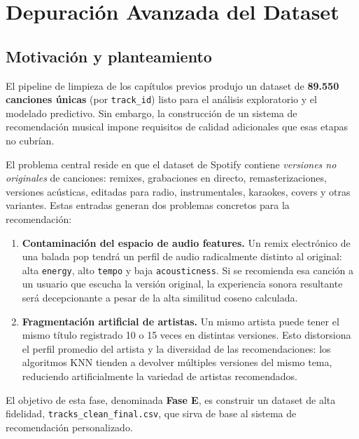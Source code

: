 \documentclass[12pt, a4paper]{book}
\theoremstyle{definition}
\begin{document}
\chapter{Depuración Avanzada del Dataset}
\label{ch:depuracion}

\section{Motivación y planteamiento}

El pipeline de limpieza de los capítulos previos produjo un dataset de
\textbf{89.550 canciones únicas} (por \texttt{track\_id}) listo para el
análisis exploratorio y el modelado predictivo. Sin embargo, la construcción
de un sistema de recomendación musical impone requisitos de calidad
adicionales que esas etapas no cubrían.

El problema central reside en que el dataset de Spotify contiene
\textit{versiones no originales} de canciones: remixes, grabaciones en
directo, remasterizaciones, versiones acústicas, editadas para radio,
instrumentales, karaokes, covers y otras variantes. Estas entradas generan
dos problemas concretos para la recomendación:

\begin{enumerate}
  \item \textbf{Contaminación del espacio de audio features.} Un remix
        electrónico de una balada pop tendrá un perfil de audio radicalmente
        distinto al original: alta \texttt{energy}, alto \texttt{tempo}
        y baja \texttt{acousticness}. Si se recomienda esa canción a un
        usuario que escucha la versión original, la experiencia sonora
        resultante será decepcionante a pesar de la alta similitud coseno
        calculada.

  \item \textbf{Fragmentación artificial de artistas.} Un mismo artista
        puede tener el mismo título registrado 10 o 15 veces en distintas
        versiones. Esto distorsiona el perfil promedio del artista y la
        diversidad de las recomendaciones: los algoritmos KNN tienden a
        devolver múltiples versiones del mismo tema, reduciendo
        artificialmente la variedad de artistas recomendados.
\end{enumerate}

El objetivo de esta fase, denominada \textbf{Fase E}, es construir un
dataset de alta fidelidad, \texttt{tracks\_clean\_final.csv}, que sirva
de base al sistema de recomendación personalizado.
\end{document}

